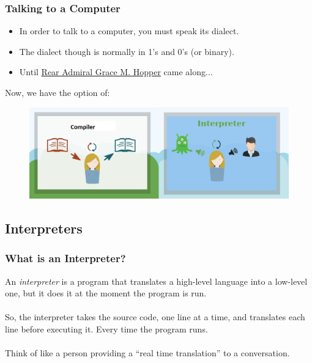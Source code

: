 \documentclass{beamer}\usepackage[]{graphicx}\usepackage[]{color}
\begin{document}
\begin{frame}
\frametitle{Talking to a Computer}

\begin{itemize}
\item In order to talk to a computer, you must speak its dialect. 
\item The dialect though is normally in 1's and 0's (or binary). 
\item Until \href{http://www.biography.com/people/grace-hopper-21406809}{Rear Admiral Grace M. Hopper} came along...
\end{itemize}

Now, we have the option of:

\begin{figure}
\centering
\includegraphics[width=\linewidth]{compiler_vs_interpreter}
\end{figure}

\end{frame}

\subsection{Interpreters}
\begin{frame}
\frametitle{What is an Interpreter?}

An \textit{interpreter} is a program that translates a high-level language into a low-level one, but it does it at the moment the program is run. 
\\$ $\\
So, the interpreter takes the source code, one line at a time, and translates each line before executing it. Every time the program runs.
\\$ $\\
Think of like a person providing a ``real time translation'' to a conversation.

\begin{center}

\end{center}

\end{frame}
\end{document}
